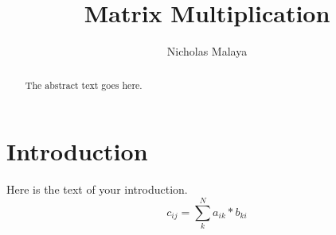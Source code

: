 \documentclass{article}
\begin{document}
\title{Matrix Multiplication}
\author{Nicholas Malaya}

\maketitle

\begin{abstract}
The abstract text goes here.
\end{abstract}

\section{Introduction}
Here is the text of your introduction.
\begin{equation}
c_{ij} = \sum_k^N a_{ik} * b_{ki}
\end{equation}
\end{document}
